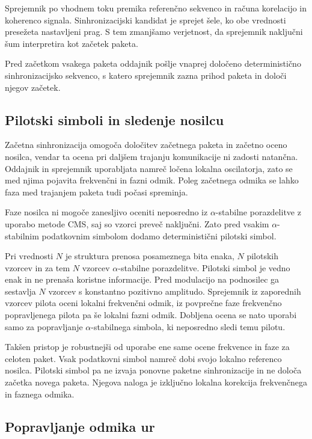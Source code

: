 \documentclass[a4paper, 12pt, openany]{book}
\begin{document}
Sprejemnik po vhodnem toku premika referenčno sekvenco in računa korelacijo in koherenco signala. Sinhronizacijski kandidat je sprejet šele, ko obe vrednosti presežeta nastavljeni prag. S tem zmanjšamo verjetnost, da sprejemnik naključni šum interpretira kot začetek paketa.

Pred začetkom vsakega paketa oddajnik pošlje vnaprej določeno deterministično sinhronizacijsko sekvenco, s katero sprejemnik zazna prihod paketa in določi njegov začetek.

\subsection{Pilotski simboli in sledenje nosilcu}

Začetna sinhronizacija omogoča določitev začetnega paketa in začetno oceno nosilca, vendar ta ocena pri daljšem trajanju komunikacije ni zadosti natančna. Oddajnik in sprejemnik uporabljata namreč ločena lokalna oscilatorja, zato se med njima pojavita frekvenčni in fazni odmik. Poleg začetnega odmika se lahko faza med trajanjem paketa tudi počasi spreminja.

Faze nosilca ni mogoče zanesljivo oceniti neposredno iz $\alpha$-stabilne porazdelitve z uporabo metode CMS, saj so vzorci preveč naključni. Zato pred vsakim $\alpha$-stabilnim podatkovnim simbolom dodamo deterministični pilotski simbol.

Pri vrednosti $N$ je struktura prenosa posameznega bita enaka, $N$ pilotskih vzorcev in za tem $N$ vzorcev $\alpha$-stabilne porazdelitve. Pilotski simbol je vedno enak in ne prenaša koristne informacije. Pred modulacijo na podnosilec ga sestavlja $N$ vzorcev s konstantno pozitivno amplitudo. Sprejemnik iz zaporednih vzorcev pilota oceni lokalni frekvenčni odmik, iz povprečne faze frekvenčno popravljenega pilota pa še lokalni fazni odmik. Dobljena ocena se nato uporabi samo za popravljanje $\alpha$-stabilnega simbola, ki neposredno sledi temu pilotu.

Takšen pristop je robustnejši od uporabe ene same ocene frekvence in faze za celoten paket. Vsak podatkovni simbol namreč dobi svojo lokalno referenco nosilca. Pilotski simbol pa ne izvaja ponovne paketne sinhronizacije in ne določa začetka novega paketa. Njegova naloga je izključno lokalna korekcija frekvenčnega in faznega odmika.

\subsection{Popravljanje odmika ur}
\end{document}
